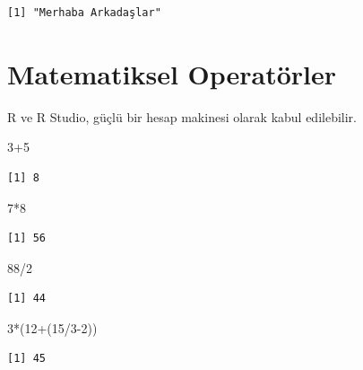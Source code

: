 \documentclass[
  letterpaper,
  DIV=11,
  numbers=noendperiod]{scrreprt}
\newenvironment{Shaded}{\begin{snugshade}}{\end{snugshade}}
\newcommand{\DecValTok}[1]{\textcolor[rgb]{0.68,0.00,0.00}{#1}}
\newcommand{\NormalTok}[1]{\textcolor[rgb]{0.00,0.23,0.31}{#1}}
\newcommand{\SpecialCharTok}[1]{\textcolor[rgb]{0.37,0.37,0.37}{#1}}
\begin{document}
\begin{verbatim}
[1] "Merhaba Arkadaşlar"
\end{verbatim}

\hypertarget{matematiksel-operatuxf6rler}{%
\section{Matematiksel Operatörler}\label{matematiksel-operatuxf6rler}}

R ve R Studio, güçlü bir hesap makinesi olarak kabul edilebilir.

\begin{Shaded}
\begin{Highlighting}[]
\DecValTok{3}\SpecialCharTok{+}\DecValTok{5} 
\end{Highlighting}
\end{Shaded}

\begin{verbatim}
[1] 8
\end{verbatim}

\begin{Shaded}
\begin{Highlighting}[]
\DecValTok{7}\SpecialCharTok{*}\DecValTok{8} 
\end{Highlighting}
\end{Shaded}

\begin{verbatim}
[1] 56
\end{verbatim}

\begin{Shaded}
\begin{Highlighting}[]
\DecValTok{88}\SpecialCharTok{/}\DecValTok{2} 
\end{Highlighting}
\end{Shaded}

\begin{verbatim}
[1] 44
\end{verbatim}

\begin{Shaded}
\begin{Highlighting}[]
\DecValTok{3}\SpecialCharTok{*}\NormalTok{(}\DecValTok{12}\SpecialCharTok{+}\NormalTok{(}\DecValTok{15}\SpecialCharTok{/}\DecValTok{3{-}2}\NormalTok{)) }
\end{Highlighting}
\end{Shaded}

\begin{verbatim}
[1] 45
\end{verbatim}
\end{document}
